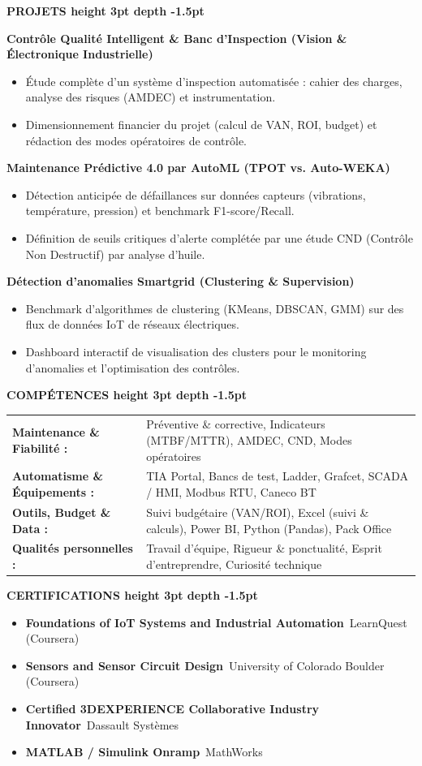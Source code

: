 \documentclass[10pt,a4paper]{altacv}
\renewcommand{\cvsection}[2][]{%
  \vspace{3pt}%
  {\color{heading}\Large\bfseries #2 \hspace{0.2em}\leaders\vrule height 3pt depth -1.5pt\hfill\mbox{}}\par\vspace{2.5pt}
}
\newenvironment{cvitems}{\begin{itemize}[leftmargin=*, label=\textbullet, nosep, itemsep=1.5pt]}{\end{itemize}}
\newcommand{\cvprojet}[1]{{\normalsize\bfseries\color{accent} #1}\par\vspace{1.5pt}}
\begin{document}
\cvsection{PROJETS}
\cvprojet{Contrôle Qualité Intelligent \& Banc d’Inspection (Vision \& Électronique Industrielle)}
\begin{cvitems}
  \item Étude complète d’un système d’inspection automatisée : cahier des charges, analyse des risques (AMDEC) et instrumentation.
  \item Dimensionnement financier du projet (calcul de VAN, ROI, budget) et rédaction des modes opératoires de contrôle.
\end{cvitems}
\vspace{2pt}
\cvprojet{Maintenance Prédictive 4.0 par AutoML (TPOT vs. Auto-WEKA)}
\begin{cvitems}
  \item Détection anticipée de défaillances sur données capteurs (vibrations, température, pression) et benchmark F1-score/Recall.
  \item Définition de seuils critiques d’alerte complétée par une étude CND (Contrôle Non Destructif) par analyse d’huile.
\end{cvitems}
\vspace{2pt}
\cvprojet{Détection d’anomalies Smartgrid (Clustering \& Supervision)}
\begin{cvitems}
  \item Benchmark d’algorithmes de clustering (KMeans, DBSCAN, GMM) sur des flux de données IoT de réseaux électriques.
  \item Dashboard interactif de visualisation des clusters pour le monitoring d’anomalies et l’optimisation des contrôles.
\end{cvitems}

\cvsection{COMPÉTENCES}
{\small
\begin{tabular}{@{}ll@{}}
\textbf{Maintenance \& Fiabilité :} & Préventive \& corrective, Indicateurs (MTBF/MTTR), AMDEC, CND, Modes opératoires \\[1.5pt]
\textbf{Automatisme \& Équipements :} & TIA Portal, Bancs de test, Ladder, Grafcet, SCADA / HMI, Modbus RTU, Caneco BT \\[1.5pt]
\textbf{Outils, Budget \& Data :} & Suivi budgétaire (VAN/ROI), Excel (suivi \& calculs), Power BI, Python (Pandas), Pack Office \\[1.5pt]
\textbf{Qualités personnelles :} & Travail d’équipe, Rigueur \& ponctualité, Esprit d’entreprendre, Curiosité technique
\end{tabular}
}

\cvsection{CERTIFICATIONS}
\begin{cvitems}
  \item \textbf{Foundations of IoT Systems and Industrial Automation}~\hfill {\color{emphasis}LearnQuest (Coursera)}
  \item \textbf{Sensors and Sensor Circuit Design}~\hfill {\color{emphasis}University of Colorado Boulder (Coursera)}
  \item \textbf{Certified 3DEXPERIENCE Collaborative Industry Innovator}~\hfill {\color{emphasis}Dassault Systèmes}
  \item \textbf{MATLAB / Simulink Onramp}~\hfill {\color{emphasis}MathWorks}
\end{cvitems}
\end{document}
